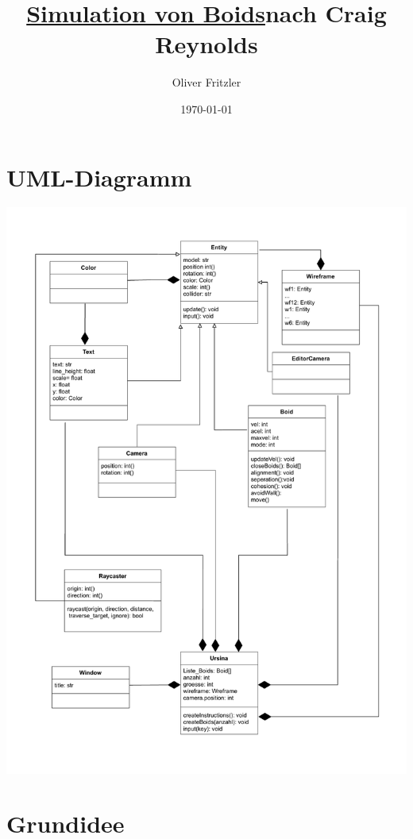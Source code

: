 \documentclass[a4paper, hidelinks, 12pt]{article}
\begin{document}
	
\begin{titlepage}
\title{\Huge{\textbf{\underline{Simulation von Boids}}}\linebreak\LARGE\textbf{nach Craig Reynolds}}
\author{Oliver Fritzler}
\date{\today}
\maketitle
\end{titlepage}

\tableofcontents

\section{UML-Diagramm}
\includegraphics[scale=0.75, page=1]{UML/Boids_UML.pdf}
\newpage

\section{Grundidee}
\end{document}
